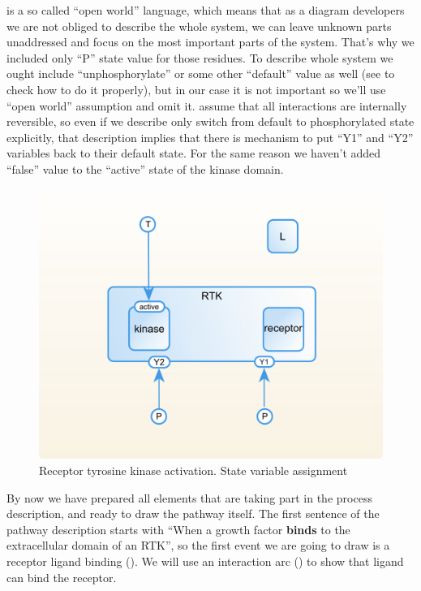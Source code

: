 \SBGNERLone is a so called ``open world'' language, which means that as a diagram developers we are not obliged to describe the whole system, we can leave unknown parts unaddressed and focus on the most important parts of the system. That's why we included only ``P'' state value for those residues. To describe whole system we ought include ``unphosphorylate'' or some other ``default'' value as well (see  to check how to do it properly), but in our case it is not important so we'll use ``open world'' assumption and omit it.  \SBGNERLone assume that all interactions are internally reversible, so even if we describe only switch from default to phosphorylated state explicitly, that description implies that there is mechanism to put ``Y1'' and ``Y2'' variables back to their default state. For the same reason we haven't added ``false'' value to the ``active''
 state of the kinase domain.
 
\begin{figure}[H]
  \centering
  \vspace*{-0.75em}
  \includegraphics[scale=0.75]{examples/rtk-states.png}
   \caption{Receptor tyrosine kinase activation. State variable assignment}
  \label{fig:rtk-states}
\end{figure}

By now we have prepared all elements that are taking part in the process description, and ready to draw the pathway itself. The first sentence of the pathway description starts with ``When a growth factor \textbf{binds} to the extracellular domain of an RTK'', so the first event we are going to draw is a receptor ligand binding (). We will use an interaction arc () to show that ligand can bind the receptor.


